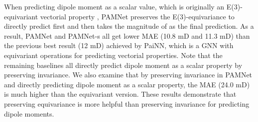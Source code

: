 \documentclass[fleqn,10pt]{wlscirep}
\newcommand{\method}{PAMNet\xspace}
\begin{document}
When predicting dipole moment  as a scalar value, which is originally an E(3)-equivariant vectorial property , \method preserves the E(3)-equivariance to directly predict  first and then takes the magnitude of  as the final prediction. As a result, \method and \method-s all get lower MAE (10.8 mD and 11.3 mD) than the previous best result (12 mD) achieved by PaiNN, which is a GNN with equivariant operations for predicting vectorial properties. Note that the remaining baselines all directly predict dipole moment as a scalar property by preserving invariance. We also examine that by preserving invariance in \method and directly predicting dipole moment as a scalar property, the MAE (24.0 mD) is much higher than the equivariant version. These results demonstrate that preserving equivariance is more helpful than preserving invariance for predicting dipole moments. 
\end{document}
